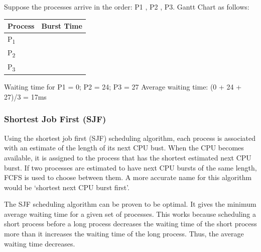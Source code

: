 Suppose the processes arrive in the order: P1 , P2 , P3. Gantt Chart as follows:
\renewcommand{\arraystretch}{2} %

\begin{center}
\begin{tabular}{|>{\centering\arraybackslash}m{4cm}|>{\centering\arraybackslash}m{4cm}|}
\hline
\textbf{Process} & \textbf{Burst Time} \\
\hline
P\textsubscript{1} & 24 \\
\hline
P\textsubscript{2} & 3 \\
\hline
P\textsubscript{3} & 3 \\
\hline
\end{tabular}
\end{center}


Waiting time for P1 = 0; P2 = 24; P3 = 27
Average waiting time: (0 + 24 + 27)/3 = 17ms

\subsubsection{Shortest Job First (SJF)}

Using the shortest job first (SJF) scheduling algorithm, each process is associated with an estimate of the length of its next CPU bust.
When the CPU becomes available, it is assigned to the process that has the shortest estimated next CPU burst.
If two processes are estimated to have next CPU bursts of the same length, FCFS is used to choose between them.
A more accurate name for this algorithm would be `shortest next CPU burst first'.

The SJF scheduling algorithm can be proven to be optimal.
It gives the minimum average waiting time for a given set of processes.
This works because scheduling a short process before a long process decreases the waiting time of the short process more than it increases the waiting time of the long process.
Thus, the average waiting time decreases.

